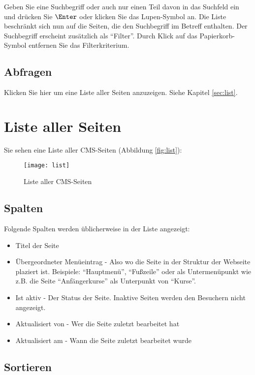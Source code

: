 \documentclass[article, a4paper, oneside, 11pt]{memoir}
\begin{document}
Geben Sie eine Suchbegriff oder auch nur einen Teil davon in das Suchfeld ein und drücken Sie $\Enter$ oder klicken Sie das Lupen-Symbol an.
Die Liste beschränkt sich nun auf die Seiten, die den Suchbegriff im Betreff enthalten. Der Suchbegriff erscheint zusätzlich als "`Filter"'. Durch Klick auf das Papierkorb-Symbol entfernen Sie das Filterkriterium.

\section{Abfragen}

Klicken Sie hier um eine Liste aller Seiten anzuzeigen. Siehe Kapitel \vref{sec:list}.

\chapter{Liste aller Seiten}
\label{sec:list}

Sie sehen eine Liste aller CMS-Seiten (Abbildung \vref{fig:list}):

\begin{figure}[htp]
\centering
\texttt{[image: list]}
\caption{Liste aller CMS-Seiten}
\label{fig:list}
\end{figure}


\section{Spalten}

Folgende Spalten werden üblicherweise in der Liste angezeigt:

\begin{itemize}
\item Titel der Seite
\item Übergeordneter Menüeintrag - Also wo die Seite in der Struktur der Webseite plaziert ist. Beispiele: "`Hauptmenü"', "`Fußzeile"' oder als Untermenüpunkt wie z.B. die Seite "`Anfängerkurse"' als Unterpunkt von "`Kurse"'.
\item Ist aktiv - Der Status der Seite. Inaktive Seiten werden den Besuchern nicht angezeigt.
\item Aktualisiert von - Wer die Seite zuletzt bearbeitet hat
\item Aktualisiert am - Wann die Seite zuletzt bearbeitet wurde
\end{itemize}


\section{Sortieren}
\end{document}
